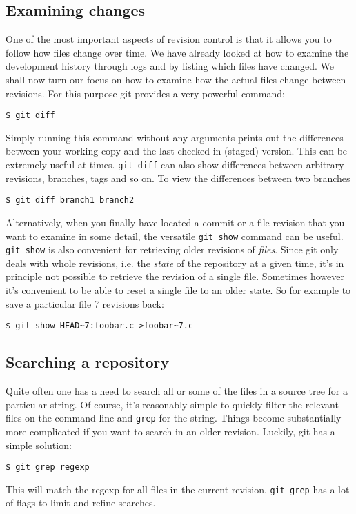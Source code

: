 \documentclass[a4paper,10pt]{article}
\begin{document}
\subsection{Examining changes}
One of the most important aspects of revision control is that it allows you to
follow how files change over time. We have already looked at how to examine
the development history through logs and by listing which files have changed.
We shall now turn our focus on how to examine how the actual files change
between revisions. For this purpose git provides a very powerful command:
\begin{verbatim}
$ git diff
\end{verbatim}
Simply running this command without any arguments prints out the differences
between your working copy and the last checked in (staged) version. 
This can be
extremely useful at times. \texttt{git diff} can also show differences between
arbitrary revisions, branches, tags and so on. To view the differences
between two branches
\begin{verbatim}
$ git diff branch1 branch2
\end{verbatim}

Alternatively, when you finally have located a commit or a file revision that
you want to examine in some detail, the versatile \texttt{git show} command
can be useful.  \texttt{git show} is also convenient for retrieving older
revisions of \emph{files}. Since git only deals with whole revisions, i.e. the
\emph{state} of the repository at a given time, it's in principle not possible
to retrieve the revision of a single file. Sometimes however it's convenient
to be able to reset a single file to an older state.  So for example to save a
particular file 7 revisions back:
\begin{verbatim}
$ git show HEAD~7:foobar.c >foobar~7.c
\end{verbatim}


\subsection{Searching a repository}
Quite often one has a need to search all or some of the files in a source
tree for a particular string. Of course, it's reasonably simple to quickly
filter the relevant files on the command line and \texttt{grep} for the
string. Things become substantially more complicated if you want to search in 
an older revision. Luckily, git has a simple solution:
\begin{verbatim}
$ git grep regexp 
\end{verbatim}
This will match the regexp for all files in the current revision.
\texttt{git grep} has a lot of flags to limit and refine searches.
\end{document}
